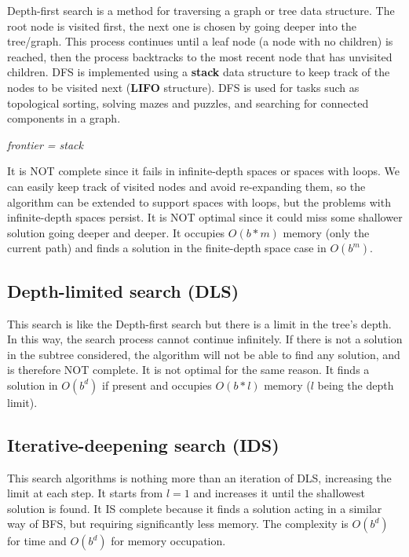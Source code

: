 \documentclass{article}
\begin{document}
Depth-first search is a method for traversing a graph or tree data structure. The root node is visited first, the next one is chosen by going deeper into the tree/graph. This process continues until a leaf node (a node with no children) is reached, then the process backtracks to the most recent node that has unvisited children. DFS is implemented using a \textbf{stack} data structure to keep track of the nodes to be visited next (\textbf{LIFO} structure). DFS is used for tasks such as topological sorting, solving mazes and puzzles, and searching for connected components in a graph.

\begin{center}
    \textit{frontier = stack}
\end{center}

It is NOT complete since it fails in infinite-depth spaces or spaces with loops. We can easily keep track of visited nodes and avoid re-expanding them, so the algorithm can be extended to support spaces with loops, but the problems with infinite-depth spaces persist. It is NOT optimal since it could miss some shallower solution going deeper and deeper. It occupies $O(b * m)$ memory (only the current path) and finds a solution in the finite-depth space case in $O(b^m)$. 

\newpage

\subsection{Depth-limited search (DLS)}

This search is like the Depth-first search but there is a limit in the tree's depth. In this way, the search process cannot continue infinitely. If there is not a solution in the subtree considered, the algorithm will not be able to find any solution, and is therefore NOT complete. It is not optimal for the same reason. It finds a solution in $O(b^d)$ if present and occupies $O(b*l)$ memory ($l$ being the depth limit).

\newpage

\subsection{Iterative-deepening search (IDS)}

This search algorithms is nothing more than an iteration of DLS, increasing the limit at each step. It starts from $l=1$ and increases it until the shallowest solution is found. It IS complete because it finds a solution acting in a similar way of BFS, but requiring significantly less memory. The complexity is $O(b^d)$ for time and $O(b^d)$ for memory occupation. 
\end{document}
